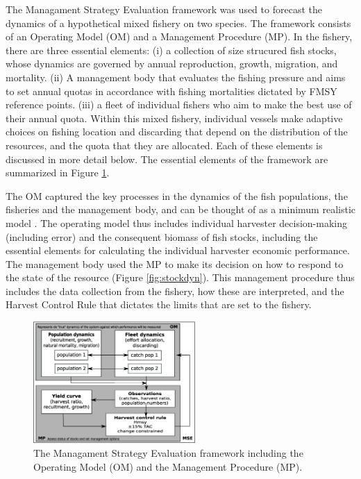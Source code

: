 \documentclass[12pt,oneline,a4paper,numbib]{ouparticle}
\numberwithin{equation}{subsection} %
\begin{document}
The Managament Strategy Evaluation framework was used to forecast the dynamics of a hypothetical mixed fishery on two species. The framework consists of an Operating Model (OM) and a Management Procedure (MP). In the fishery, there are three essential elements: (i) a collection of size strucured fish stocks, whose dynamics are governed by annual reproduction, growth, migration, and mortality. (ii) A management body that evaluates the fishing pressure and aims to set annual quotas in accordance with fishing mortalities dictated by FMSY reference points. (iii) a fleet of individual fishers who aim to make the best use of their annual quota. Within this mixed fishery, individual vessels make adaptive choices on fishing location and discarding that depend on the distribution of the resources, and the quota that they are allocated. Each of these elements is discussed in more detail below. The essential elements of the framework are summarized in Figure \ref{fig:MSE}.

The OM captured the key processes in the dynamics of the fish populations, the fisheries and the management body, and can be thought of as a minimum realistic model \cite{Punt1995}.  The operating model thus includes  individual harvester decision-making (including error) and the consequent biomass of fish stocks, including the essential elements for calculating the individual harvester economic performance. The  management body used the MP to make its decision on how to respond to the state of the resource  (Figure \ref{fig:stockdyn}). This management procedure thus includes the data collection from the fishery, how these are interpreted, and the Harvest Control Rule that dictates the limits that are set to the fishery. 

 
\begin{figure}[!h]
\centering
\includegraphics[width=0.55\textwidth]{Figures/MSE.eps} 
\caption{The Managament Strategy Evaluation framework including the Operating Model (OM) and the Management Procedure (MP).}
\label{fig:MSE}
\end{figure}
\end{document}
